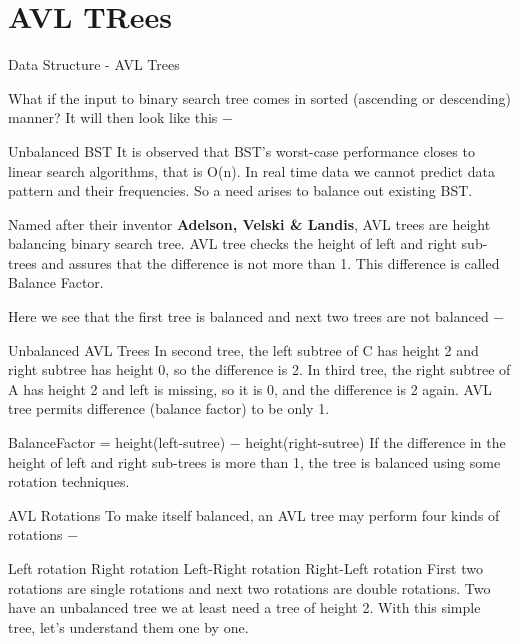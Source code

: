 \documentclass{beamer}
\begin{document}
\section{AVL TRees}
\begin{frame}


Data Structure - AVL Trees
\end{frame}
\begin{frame}
What if the input to binary search tree comes in sorted (ascending or descending) manner? It will then look like this −

Unbalanced BST
It is observed that BST's worst-case performance closes to linear search algorithms, that is Ο(n). In real time data we cannot predict data pattern and their frequencies. So a need arises to balance out existing BST.
\end{frame}
\begin{frame}
Named after their inventor \textbf{Adelson, Velski \& Landis}, AVL trees are height balancing binary search tree. AVL tree checks the height of left and right sub-trees and assures that the difference is not more than 1. This difference is called Balance Factor.

Here we see that the first tree is balanced and next two trees are not balanced −

\end{frame}
\begin{frame}
Unbalanced AVL Trees
In second tree, the left subtree of C has height 2 and right subtree has height 0, so the difference is 2. In third tree, the right subtree of A has height 2 and left is missing, so it is 0, and the difference is 2 again. AVL tree permits difference (balance factor) to be only 1.

BalanceFactor = height(left-sutree) − height(right-sutree)
If the difference in the height of left and right sub-trees is more than 1, the tree is balanced using some rotation techniques.
\end{frame}
\begin{frame}
AVL Rotations
To make itself balanced, an AVL tree may perform four kinds of rotations −

Left rotation
Right rotation
Left-Right rotation
Right-Left rotation
First two rotations are single rotations and next two rotations are double rotations. Two have an unbalanced tree we at least need a tree of height 2. With this simple tree, let's understand them one by one.
\end{frame}
\end{document}
